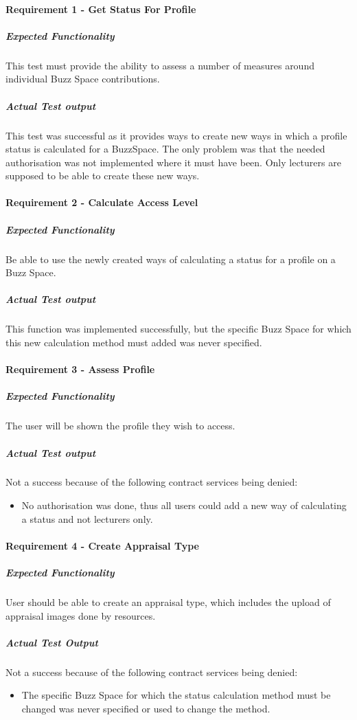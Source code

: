 
\paragraph{Requirement 1 - Get Status For Profile}
	\subparagraph{Expected Functionality}
	This test must provide the ability to assess a number of measures around individual Buzz Space contributions.
	
	\subparagraph{Actual Test output}
	This test was successful as it provides ways to create new ways in which a profile status is calculated for a BuzzSpace. The only problem was that the needed 			authorisation was not implemented where it must have been. Only lecturers are supposed to be able to create these new ways. 
		

\paragraph{Requirement 2 - Calculate Access Level}
	\subparagraph{Expected Functionality}
	Be able to use the newly created ways of calculating a status for a profile on a Buzz Space.
	
	\subparagraph{Actual Test output}
	This function was implemented successfully,  but the specific Buzz Space for which this new calculation method must  added was never specified.

\paragraph{Requirement 3 - Assess Profile}
 	\subparagraph{Expected Functionality}
	The user will be shown the profile they wish to access.	
	\subparagraph{Actual Test output}
	Not a success because of the following contract services being denied:
	\begin{itemize}
			\item No authorisation was done, thus all users could add a new way of calculating a status and not lecturers only.
	\end{itemize}

\paragraph{Requirement 4 - Create Appraisal Type}
	\subparagraph{Expected Functionality}
	User should be able to create an appraisal type, which includes the upload of appraisal images done by resources.	
	\subparagraph{Actual Test Output}
	Not a success because of the following contract services being denied:
	\begin{itemize}
			\item The specific Buzz Space for which the status calculation method must be changed was never specified or used to change the method. 
	\end{itemize}	

